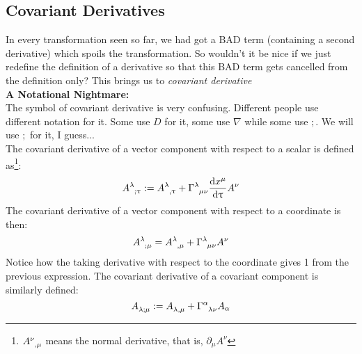 \subsection{Covariant Derivatives}
In every transformation seen so far, we had got a BAD term (containing a second derivative) which spoils the transformation. So wouldn't it be nice if we just redefine the definition of a derivative so that this BAD term gets cancelled from the definition only? This brings us to \textit{covariant derivative} 
\\[0.3cm]
\textbf{A Notational Nightmare:}\\[0.3cm]
The symbol of covariant derivative is very confusing. Different people use different notation for it. Some use $D$ for it, some use $\nabla$ while some use $;$. We will use $;$ for it, I guess...\\[0.3cm]
The covariant derivative of a vector component with respect to a scalar is defined as\footnote{$\tensor{A}{^\nu _, _\mu}$ means the normal derivative, that is, $\partial_\mu A^\nu$}:
$$\tensor{A}{^\lambda _; _\uptau} := \tensor{A}{^\lambda _, _\uptau}+ \tensor{\Gamma}{^\lambda _\mu _\nu}\dv{x^\mu}{\uptau}A^\nu$$
The covariant derivative of a vector component with respect to a coordinate is then: 
$$\tensor{A}{^\lambda _; _\mu} =  \tensor{A}{^\lambda _, _\mu} +\tensor{\Gamma}{^\lambda _\mu _\nu}A^\nu$$
Notice how the taking derivative with respect to the coordinate gives 1 from the previous expression. The covariant derivative of a covariant component is similarly defined:
$$\tensor{A}{_\lambda _; _\mu} :=  \tensor{A}{_\lambda _, _\mu} +\tensor{\Gamma}{^\alpha _\lambda _\nu}A_\alpha$$
